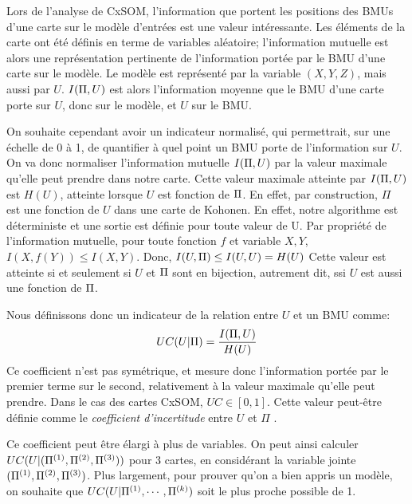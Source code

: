 Lors de l'analyse de CxSOM, l'information que portent les positions des BMUs d'une carte sur le modèle d'entrées est une valeur intéressante. Les éléments de la carte ont été définis en terme de variables aléatoire; l'information mutuelle est alors une représentation pertinente de l'information portée par le BMU d'une carte sur le modèle. Le modèle est représenté par la variable $(X,Y,Z)$, mais aussi par $U$. $I(\Pi, U)$ est alors l'information moyenne que le BMU d'une carte porte sur $U$, donc sur le modèle, et $U$ sur le BMU.

On souhaite cependant avoir un indicateur normalisé, qui permettrait, sur une échelle de 0 à 1, de quantifier à quel point un BMU porte de l'information sur $U$. On va donc normaliser l'information mutuelle $I(\Pi,U)$ par la valeur maximale qu'elle peut prendre dans notre carte.
Cette valeur maximale atteinte par $I(\Pi,U)$ est $H(U)$, atteinte lorsque $U$ est fonction de $\Pi$.
En effet, par construction, $\Pi$ est une fonction de $U$ dans une carte de Kohonen. En effet, notre algorithme est déterministe et une sortie est définie pour toute valeur de U. 
Par propriété de l'information mutuelle, pour toute fonction $f$ et variable $X,Y$, $I(X,f(Y)) \leq I(X,Y) $.
Donc, $I(U,\Pi) \leq I(U,U) = H(U)$
Cette valeur est atteinte si et seulement si $U$ et $\Pi$ sont en bijection, autrement dit, ssi $U$ est aussi une fonction de $\Pi$.


Nous définissons donc un indicateur de la relation entre $U$ et un BMU comme:
\begin{equation}
UC(U|\Pi) = \frac{I(\Pi,U)}{H(U)}
\end{equation}
Ce coefficient n'est pas symétrique, et mesure donc l'information portée par le premier terme sur le second, relativement à la valeur maximale qu'elle peut prendre. Dans le cas des cartes CxSOM, $UC \in [0,1]$. Cette valeur peut-être définie comme le \emph{coefficient d'incertitude} entre $U$ et $\Pi$ \cite{Theil1961EconomicFA}.


 
Ce coefficient peut être élargi à plus de variables. On peut ainsi calculer $UC(U | (\Pi^{({1})},\Pi^{({2})},\Pi^{({3})}))$ pour 3 cartes, en considérant la variable jointe $(\Pi^{({1})},\Pi^{({2})},\Pi^{({3})})$. Plus largement, pour prouver qu'on a bien appris un modèle, on souhaite que $UC(U|\Pi^{({1})},\cdots,\Pi^{({k})})$ soit le plus proche possible de 1.

